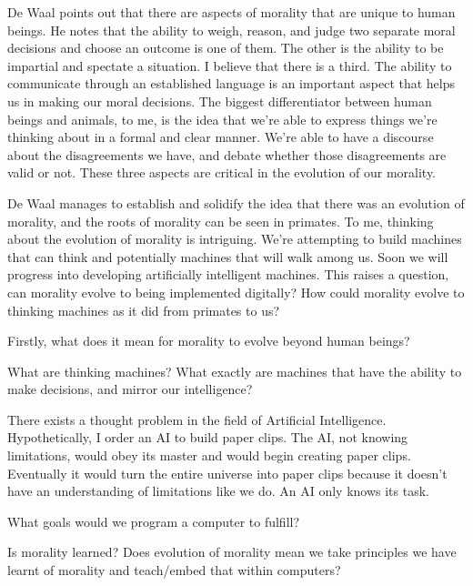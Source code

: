 \documentclass[11pt, oneside]{article}
\begin{document}
\par De Waal points out that there are aspects of morality that are unique to human beings. He notes that the ability to weigh, reason, and judge two separate moral decisions and choose an outcome is one of them. The other is the ability to be impartial and spectate a situation. I believe that there is a third. The ability to communicate through an established language is an important aspect that helps us in making our moral decisions. The biggest differentiator between human beings and animals, to me, is the idea that we're able to express things we're thinking about in a formal and clear manner. We're able to have a discourse about the disagreements we have, and debate whether those disagreements are valid or not. These three aspects are critical in the evolution of our morality.

\par De Waal manages to establish and solidify the idea that there was an evolution of morality, and the roots of morality can be seen in primates. To me, thinking about the evolution of morality is intriguing. We're attempting to build machines that can think and potentially machines that will walk among us. Soon we will progress into developing artificially intelligent machines. This raises a question, can morality evolve to being implemented digitally? How could morality evolve to thinking machines as it did from primates to us?

\par Firstly, what does it mean for morality to evolve beyond human beings? 

\par What are thinking machines? What exactly are machines that have the ability to make decisions, and mirror our intelligence? 

\par There exists a thought problem in the field of Artificial Intelligence. Hypothetically, I order an AI to build paper clips. The AI, not knowing limitations, would obey its master and would begin creating paper clips. Eventually it would turn the entire universe into paper clips because it doesn't have an understanding of limitations like we do. An AI only knows its task. 

\par What goals would we program a computer to fulfill?

\par Is morality learned? Does evolution of morality mean we take principles we have learnt of morality and teach/embed that within computers?
\end{document}
